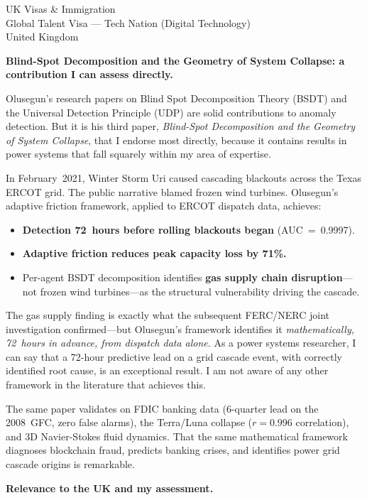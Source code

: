 \documentclass[12pt,a4paper]{letter}
\begin{document}
\begin{letter}{UK Visas \& Immigration\\
Global Talent Visa --- Tech Nation (Digital Technology)\\
United Kingdom}

\textbf{Blind-Spot Decomposition and the Geometry of System Collapse: a
contribution I can assess directly.}

Olusegun's research papers on Blind Spot Decomposition Theory (BSDT) and
the Universal Detection Principle (UDP) are solid contributions to
anomaly detection.  But it is his third paper, \textit{Blind-Spot
Decomposition and the Geometry of System Collapse}, that I endorse most
directly, because it contains results in power systems that fall
squarely within my area of expertise.

In February~2021, Winter Storm Uri caused cascading blackouts across the
Texas ERCOT grid.  The public narrative blamed frozen wind turbines.
Olusegun's adaptive friction framework, applied to ERCOT dispatch data,
achieves:

\begin{itemize}
  \item \textbf{Detection 72~hours before rolling blackouts began}
    (AUC~=~0.9997).
  \item \textbf{Adaptive friction reduces peak capacity loss by 71\%.}
  \item Per-agent BSDT decomposition identifies \textbf{gas supply
    chain disruption}---not frozen wind turbines---as the structural
    vulnerability driving the cascade.
\end{itemize}

The gas supply finding is exactly what the subsequent FERC/NERC joint
investigation confirmed---but Olusegun's framework identifies it
\textit{mathematically, 72~hours in advance, from dispatch data alone}.
As a power systems researcher, I can say that a 72-hour predictive lead
on a grid cascade event, with correctly identified root cause, is an
exceptional result.  I am not aware of any other framework in the
literature that achieves this.

The same paper validates on FDIC banking data (6-quarter lead on the
2008~GFC, zero false alarms), the Terra/Luna collapse ($r = 0.996$
correlation), and 3D Navier-Stokes fluid dynamics.  That the same
mathematical framework diagnoses blockchain fraud, predicts banking
crises, and identifies power grid cascade origins is remarkable.


\textbf{Relevance to the UK and my assessment.}


\end{letter}
\end{document}

